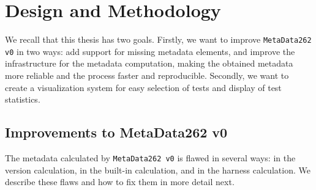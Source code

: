 \documentclass[runningheads]{llncs}
\begin{document}


\section{Design and Methodology}
\label{sec:Design and Methodology}



We recall that this thesis has two goals. Firstly, we want to improve \texttt{MetaData262 v0} in two ways: add support for missing metadata elements, and improve the infrastructure for the metadata computation, making the obtained metadata more reliable and the process faster and reproducible. Secondly, we want to create a visualization system for easy selection of tests and display of test statistics.


\subsection{Improvements to MetaData262 v0}
\label{sub:improvements_to_metadata262_v0}


The metadata calculated by \texttt{MetaData262 v0} is flawed in several ways: in the version calculation, in the built-in calculation, and in the harness calculation. We describe these flaws and how to fix them in more detail next.
\end{document}

